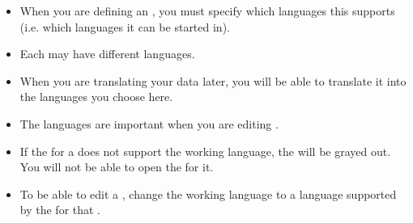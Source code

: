 
\label{tasksautlangs}
\begin{itemize}
\item When you are defining an \gdaut{}, you must specify which languages this \gdaut{} supports (i.e. which languages it can be started in).
\item Each \gdaut{} may have different languages. 
\item When you are translating your data later, you will be able to translate it into the languages you choose here. 
\item The \gdaut{} languages are important when you are editing \gdsuites{}. 
\item If the \gdaut{} for a \gdsuite{} does not support the working language, the \gdsuite{} will be grayed out. You will not be able to open the \gdtestsuiteeditor{} for it. 
\item To be able to edit a \gdsuite{}, change the working language to a language supported by the \gdaut{} for that \gdsuite{}.

\end{itemize}



